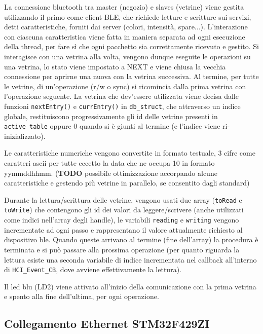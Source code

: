 La connessione bluetooth tra master (negozio) e slaves (vetrine) viene gestita utilizzando il primo come client BLE, che richiede letture e scritture sui servizi, detti caratteristiche, forniti dai server (colori, intensit\`a, spare...). L'interazione con ciascuna caratteristica viene fatta in maniera separata ad ogni esecuzione della thread, per fare s\`i che ogni pacchetto sia correttamente ricevuto e gestito. Si interagisce con una vetrina alla volta, vengono dunque eseguite le operazioni su una vetrina, lo stato viene impostato a NEXT e viene chiusa la vecchia connessione per aprirne una nuova con la vetrina successiva. Al termine, per tutte le vetrine, di un'operazione (r/w o sync) si ricomincia dalla prima vetrina con l'operazione seguente. La vetrina che dev'essere utilizzata viene decisa dalle funzioni \texttt{nextEntry()} e \texttt{currEntry()} in \texttt{db\_struct}, che attraverso un indice globale, restituiscono progressivamente gli id delle vetrine presenti in \texttt{active\_table} oppure 0 quando si \`e giunti al termine (e l'indice viene ri-inizializzato). 

Le caratteristiche numeriche vengono convertite in formato testuale, 3 cifre come caratteri ascii per tutte eccetto la data che ne occupa 10 in formato yymmddhhmm. (\textbf{TODO} possibile ottimizzazione accorpando alcune caratteristiche e gestendo pi\`u vetrine in parallelo, se consentito dagli standard)

Durante la lettura/scrittura delle vetrine, vengono usati due array (\texttt{toRead} e \texttt{toWrite}) che contengono gli id dei valori da leggere/scrivere (anche utilizzati come indici nell'array degli handle), le variabili \texttt{reading} e \texttt{writing} vengono incrementate ad ogni passo e rappresentano il valore attualmente richiesto al dispositivo ble. Quando queste arrivano al termine (fine dell'array) la procedura \`e terminata e si pu\`o passare alla prossima operazione (per quanto riguarda la lettura esiste una seconda variabile di indice incrementata nel callback all'interno di \texttt{HCI\_Event\_CB}, dove avviene effettivamente la lettura).

Il led blu (LD2) viene attivato all'inizio della comunicazione con la prima vetrina e spento alla fine dell'ultima, per ogni operazione.

\subsection{Collegamento Ethernet STM32F429ZI}


